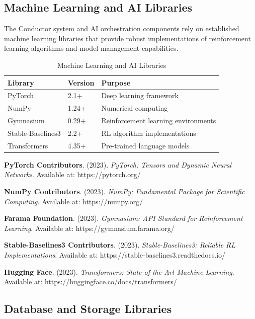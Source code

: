 \subsection*{Machine Learning and AI Libraries}

The Conductor system and AI orchestration components rely on established machine learning libraries that provide robust implementations of reinforcement learning algorithms and model management capabilities.

\begin{table}[ht]
\centering
\begin{tabular}{@{}lll@{}}
\toprule
\textbf{Library} & \textbf{Version} & \textbf{Purpose} \\
\midrule
PyTorch & 2.1+ & Deep learning framework \\
NumPy & 1.24+ & Numerical computing \\
Gymnasium & 0.29+ & Reinforcement learning environments \\
Stable-Baselines3 & 2.2+ & RL algorithm implementations \\
Transformers & 4.35+ & Pre-trained language models \\
\bottomrule
\end{tabular}
\caption{Machine Learning and AI Libraries}
\end{table}

\begin{compactlist}
    \item \textbf{PyTorch Contributors}. (2023). \textit{PyTorch: Tensors and Dynamic Neural Networks}. Available at: https://pytorch.org/
    \item \textbf{NumPy Contributors}. (2023). \textit{NumPy: Fundamental Package for Scientific Computing}. Available at: https://numpy.org/
    \item \textbf{Farama Foundation}. (2023). \textit{Gymnasium: API Standard for Reinforcement Learning}. Available at: https://gymnasium.farama.org/
    \item \textbf{Stable-Baselines3 Contributors}. (2023). \textit{Stable-Baselines3: Reliable RL Implementations}. Available at: https://stable-baselines3.readthedocs.io/
    \item \textbf{Hugging Face}. (2023). \textit{Transformers: State-of-the-Art Machine Learning}. Available at: https://huggingface.co/docs/transformers/
\end{compactlist}

\subsection*{Database and Storage Libraries}


